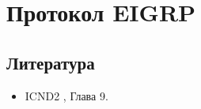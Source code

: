 \section{Протокол EIGRP}
\subsection{Литература}
\begin{itemize}
	\item ICND2 \cite{icnd2eng}, Глава 9.
\end{itemize}
